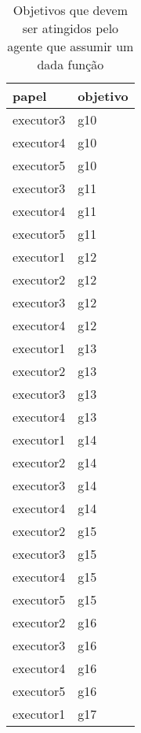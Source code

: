 \begin{table}[H]
\centering
{}
\begin{tabular}{|l|l|}
\hline
\textbf{papel} & \textbf{objetivo} \\ \hline
executor3 & g10 \\ \hline
executor4 & g10 \\ \hline
executor5 & g10 \\ \hline
executor3 & g11 \\ \hline
executor4 & g11 \\ \hline
executor5 & g11 \\ \hline
executor1 & g12 \\ \hline
executor2 & g12 \\ \hline
executor3 & g12 \\ \hline
executor4 & g12 \\ \hline
executor1 & g13 \\ \hline
executor2 & g13 \\ \hline
executor3 & g13 \\ \hline
executor4 & g13 \\ \hline
executor1 & g14 \\ \hline
executor2 & g14 \\ \hline
executor3 & g14 \\ \hline
executor4 & g14 \\ \hline
executor2 & g15 \\ \hline
executor3 & g15 \\ \hline
executor4 & g15 \\ \hline
executor5 & g15 \\ \hline
executor2 & g16 \\ \hline
executor3 & g16 \\ \hline
executor4 & g16 \\ \hline
executor5 & g16 \\ \hline
executor1 & g17 \\ \hline
\end{tabular}
\caption{Objetivos que devem ser atingidos pelo agente que assumir um dada função}
\label{deontic2}
\end{table}


